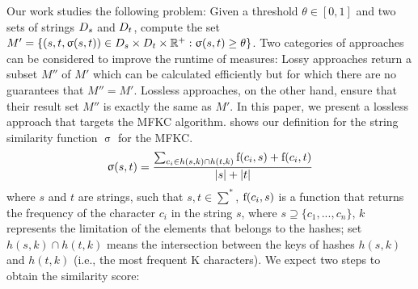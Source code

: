 Our work studies the following problem:
Given a threshold $\theta \in [0, 1]$ and two sets of strings
${D_s}{}$ and ${D_t}{}$, compute the set $M' = \{(s, t, \upsigma(s, t)) \in
{\ensuremath{D_s}}{} \times {\ensuremath{D_t}}{} \times \mathbb{R}^+ : \upsigma(s, t) \geq \theta\}$. 
Two categories of approaches can be considered to improve the runtime of measures: 
Lossy approaches return a subset $M''$ of $M'$ which can be calculated efficiently but for which there are no guarantees that $M'' = M'$. 
Lossless approaches, on the other hand, ensure that their result set $M''$ is exactly the same as $M'$.
In this paper, we present a lossless approach that targets the MFKC algorithm. 
 shows our definition for the string similarity function $\upsigma$ for the MFKC.
\begin{equation} \label{eq:1}
	\upsigma(s,t)=
	\frac
	{\sum_{c_i \in h(s,k) \cap h(t,k)} \textnormal{f}(c_i,s)+\textnormal{f}(c_i,t)}
	{|s|+|t|}
\end{equation}
where $s$ and $t$ are strings, such that $s,t \in \sum^*$, $\textnormal{f}(c_i, s)$ is a function that returns the frequency of the character $c_i$ in the string $s$, where $s \supseteq \{c_1,...,c_n\}$, $k$ represents the limitation of the elements that belongs to the hashes; set $h(s,k) \cap h(t,k)$ means the intersection between the keys of hashes $h(s,k)$ and $h(t,k)$ (i.e., the most frequent K characters).
% 
We expect two steps to obtain the similarity score:
